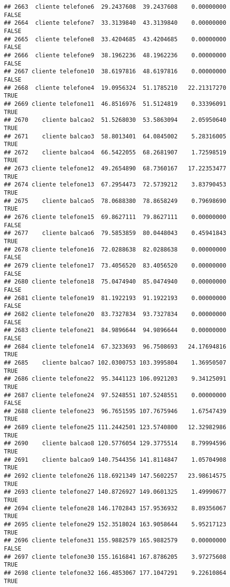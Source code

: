\documentclass[
]{article}
\begin{document}
\begin{verbatim}
## 2663  cliente telefone6  29.2437608  39.2437608    0.00000000    FALSE
## 2664  cliente telefone7  33.3139840  43.3139840    0.00000000    FALSE
## 2665  cliente telefone8  33.4204685  43.4204685    0.00000000    FALSE
## 2666  cliente telefone9  38.1962236  48.1962236    0.00000000    FALSE
## 2667 cliente telefone10  38.6197816  48.6197816    0.00000000    FALSE
## 2668  cliente telefone4  19.0956324  51.1785210   22.21317270     TRUE
## 2669 cliente telefone11  46.8516976  51.5124819    0.33396091     TRUE
## 2670    cliente balcao2  51.5268030  53.5863094    2.05950640     TRUE
## 2671    cliente balcao3  58.8013401  64.0845002    5.28316005     TRUE
## 2672    cliente balcao4  66.5422055  68.2681907    1.72598519     TRUE
## 2673 cliente telefone12  49.2654890  68.7360167   17.22353477     TRUE
## 2674 cliente telefone13  67.2954473  72.5739212    3.83790453     TRUE
## 2675    cliente balcao5  78.0688380  78.8658249    0.79698690     TRUE
## 2676 cliente telefone15  69.8627111  79.8627111    0.00000000    FALSE
## 2677    cliente balcao6  79.5853859  80.0448043    0.45941843     TRUE
## 2678 cliente telefone16  72.0288638  82.0288638    0.00000000    FALSE
## 2679 cliente telefone17  73.4056520  83.4056520    0.00000000    FALSE
## 2680 cliente telefone18  75.0474940  85.0474940    0.00000000    FALSE
## 2681 cliente telefone19  81.1922193  91.1922193    0.00000000    FALSE
## 2682 cliente telefone20  83.7327834  93.7327834    0.00000000    FALSE
## 2683 cliente telefone21  84.9896644  94.9896644    0.00000000    FALSE
## 2684 cliente telefone14  67.3233693  96.7508693   24.17694816     TRUE
## 2685    cliente balcao7 102.0300753 103.3995804    1.36950507     TRUE
## 2686 cliente telefone22  95.3441123 106.0921203    9.34125091     TRUE
## 2687 cliente telefone24  97.5248551 107.5248551    0.00000000    FALSE
## 2688 cliente telefone23  96.7651595 107.7675946    1.67547439     TRUE
## 2689 cliente telefone25 111.2442501 123.5740800   12.32982986     TRUE
## 2690    cliente balcao8 120.5776054 129.3775514    8.79994596     TRUE
## 2691    cliente balcao9 140.7544356 141.8114847    1.05704908     TRUE
## 2692 cliente telefone26 118.6921349 147.5602257   23.98614575     TRUE
## 2693 cliente telefone27 140.8726927 149.0601325    1.49990677     TRUE
## 2694 cliente telefone28 146.1702843 157.9536932    8.89356067     TRUE
## 2695 cliente telefone29 152.3518024 163.9058644    5.95217123     TRUE
## 2696 cliente telefone31 155.9882579 165.9882579    0.00000000    FALSE
## 2697 cliente telefone30 155.1616841 167.8786205    3.97275608     TRUE
## 2698 cliente telefone32 166.4853067 177.1047291    9.22610864     TRUE

\end{verbatim}
\end{document}
